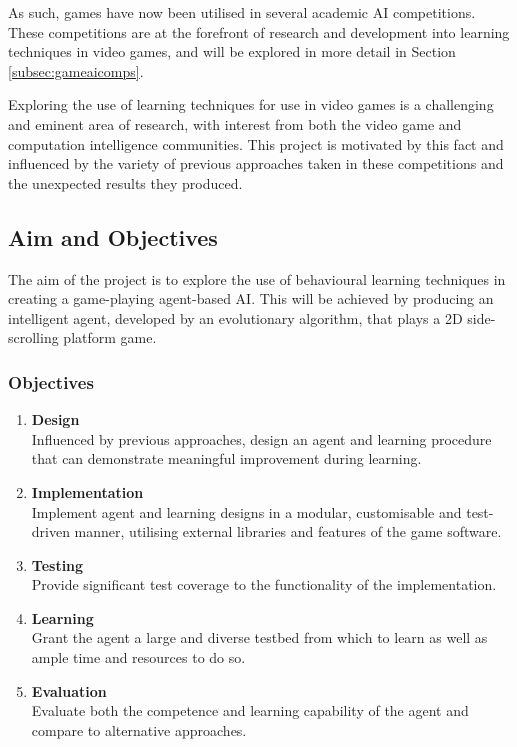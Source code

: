 As such, games have now been utilised in several academic AI competitions. These competitions are at the forefront of research and development into learning techniques in video games, and will be explored in more detail in Section \ref{subsec:gameaicomps}.

\vspace{\baselineskip}

Exploring the use of learning techniques for use in video games is a challenging and eminent area of research, with interest from both the video game and computation intelligence communities. This project is motivated by this fact and influenced by the variety of previous approaches taken in these competitions and the unexpected results they produced. 


\subsection{Aim and Objectives}
\label{subsec:aimobj}

The aim of the project is to explore the use of behavioural learning techniques in creating a game-playing agent-based AI. This will be achieved by producing an intelligent agent, developed by an evolutionary algorithm, that plays a 2D side-scrolling platform game.

\subsubsection*{Objectives}

\begin{enumerate}

	\item \label{obj:design}
	\textbf{Design} \\
	Influenced by previous approaches, design an agent and learning procedure that can demonstrate meaningful improvement during learning.
	
	\item \label{obj:impl}
	\textbf{Implementation} \\
	Implement agent and learning designs in a modular, customisable and test-driven manner, utilising external libraries and features of the game software.
	
	\item \label{obj:test}
	\textbf{Testing} \\
	Provide significant test coverage to the functionality of the implementation.
	
	\item \label{obj:learn}
	\textbf{Learning} \\
	Grant the agent a large and diverse testbed from which to learn as well as ample time and resources to do so.
	
	\item \label{obj:eval}
	\textbf{Evaluation} \\
	Evaluate both the competence and learning capability of the agent and compare to alternative approaches.

\end{enumerate}

